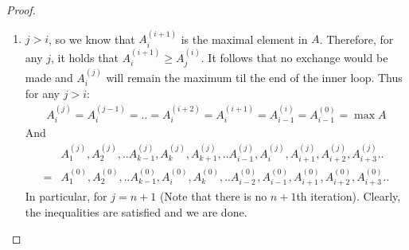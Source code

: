 \documentclass[manuscript,screen,review]{acmart}
\begin{document}
\begin{proof}
\begin{enumerate}
\begin{enumerate}
        \item $j > i$, so we know that $A^{(i+1)}_{i}$ is the maximal element in $A$. Therefore, for any $j$, it holds that $A^{(i+1)}_{i}\ge A^{(i)}_{j}$. It follows that no exchange would be made and $A^{(j)}_{i}$ will remain the maximum til the end of the inner loop. Thus for any $j >i$:   
          \begin{equation*}
            \begin{split}
              A^{(j)}_{i}=A^{(j-1)}_{i}=.. =A^{(i+2)}_{i}=A^{(i+1)}_{i}=A^{(i)}_{i-1}=A^{(0)}_{i-1}=\max A
            \end{split}
          \end{equation*}
          And 
          \begin{equation*}
            \begin{split}
             & A^{(j)}_{1}, A^{(j)}_{2}, .. A^{(j)}_{k-1}, A^{(j)}_{k}, A^{(j)}_{k+1}, .. A^{(j)}_{i-1}, A^{(j)}_{i}, A^{(j)}_{i+1} , A^{(j)}_{i+2} , A^{(j)}_{i+3} .. \\
            = & A^{(0)}_{1}, A^{(0)}_{2}, .. A^{(0)}_{k-1}, A^{(0)}_{i}, A^{(0)}_{k}, .. A^{(0)}_{i-2}, A^{(0)}_{i-1}, A^{(0)}_{i+1} , A^{(0)}_{i+2} , A^{(0)}_{i+3} .. 
            \end{split}
          \end{equation*}
          In particular, for $j = n+1$ (Note that there is no $n+1$th iteration). Clearly, the inequalities are satisfied and we are done.
\end{enumerate}
\end{enumerate}
  \end{proof}
\end{document}
